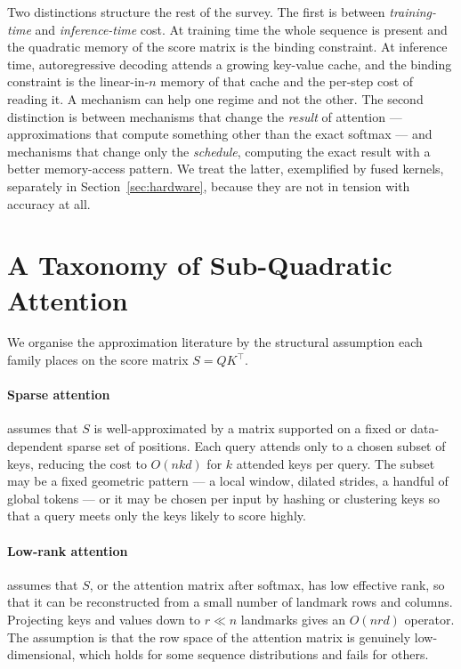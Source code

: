 \documentclass[11pt]{article}
\begin{document}
Two distinctions structure the rest of the survey. The first is between \emph{training-time} and \emph{inference-time} cost. At training time the whole sequence is present and the quadratic memory of the score matrix is the binding constraint. At inference time, autoregressive decoding attends a growing key-value cache, and the binding constraint is the linear-in-$n$ memory of that cache and the per-step cost of reading it. A mechanism can help one regime and not the other. The second distinction is between mechanisms that change the \emph{result} of attention --- approximations that compute something other than the exact softmax --- and mechanisms that change only the \emph{schedule}, computing the exact result with a better memory-access pattern. We treat the latter, exemplified by fused kernels, separately in Section~\ref{sec:hardware}, because they are not in tension with accuracy at all.

\section{A Taxonomy of Sub-Quadratic Attention}
\label{sec:taxonomy}

We organise the approximation literature by the structural assumption each family places on the score matrix $S = Q K^\top$.

\paragraph{Sparse attention} assumes that $S$ is well-approximated by a matrix supported on a fixed or data-dependent sparse set of positions. Each query attends only to a chosen subset of keys, reducing the cost to $O(n k d)$ for $k$ attended keys per query. The subset may be a fixed geometric pattern --- a local window, dilated strides, a handful of global tokens --- or it may be chosen per input by hashing or clustering keys so that a query meets only the keys likely to score highly.

\paragraph{Low-rank attention} assumes that $S$, or the attention matrix after softmax, has low effective rank, so that it can be reconstructed from a small number of landmark rows and columns. Projecting keys and values down to $r \ll n$ landmarks gives an $O(n r d)$ operator. The assumption is that the row space of the attention matrix is genuinely low-dimensional, which holds for some sequence distributions and fails for others.
\end{document}

